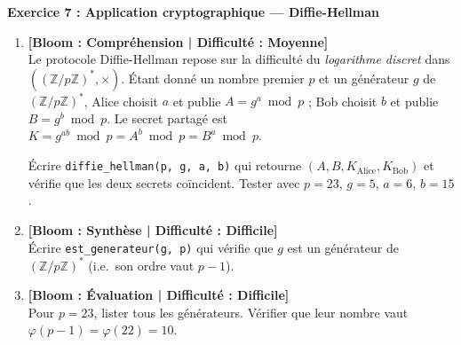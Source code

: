 \noindent\textbf{Exercice 7 : Application cryptographique --- Diffie-Hellman}
\begin{enumerate}
    \item \textbf{[Bloom : Compréhension | Difficulté : Moyenne]} \\
    Le protocole Diffie-Hellman repose sur la difficulté du \emph{logarithme discret} dans $((\mathbb{Z}/p\mathbb{Z})^*, \times)$. Étant donné un nombre premier $p$ et un générateur $g$ de $(\mathbb{Z}/p\mathbb{Z})^*$, Alice choisit $a$ et publie $A = g^a \bmod p$ ; Bob choisit $b$ et publie $B = g^b \bmod p$. Le secret partagé est $K = g^{ab} \bmod p = A^b \bmod p = B^a \bmod p$.

    Écrire \texttt{diffie\_hellman(p, g, a, b)} qui retourne $(A, B, K_{\text{Alice}}, K_{\text{Bob}})$ et vérifie que les deux secrets coïncident. Tester avec $p = 23$, $g = 5$, $a = 6$, $b = 15$.
    \item \textbf{[Bloom : Synthèse | Difficulté : Difficile]} \\
    Écrire \texttt{est\_generateur(g, p)} qui vérifie que $g$ est un générateur de $(\mathbb{Z}/p\mathbb{Z})^*$ (i.e.\ son ordre vaut $p - 1$).
    \item \textbf{[Bloom : Évaluation | Difficulté : Difficile]} \\
    Pour $p = 23$, lister tous les générateurs. Vérifier que leur nombre vaut $\varphi(p - 1) = \varphi(22) = 10$.
\end{enumerate}

\vspace{0.3cm}

